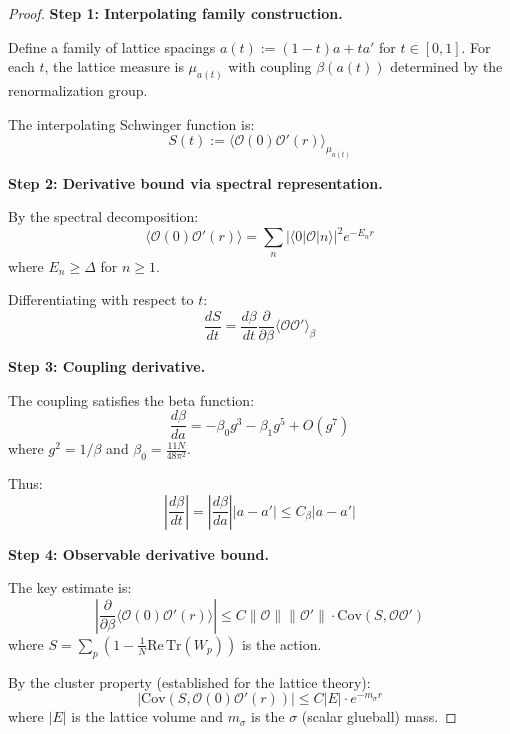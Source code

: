 \begin{proof}
\textbf{Step 1: Interpolating family construction.}

Define a family of lattice spacings $a(t) := (1-t)a + ta'$ for $t \in [0,1]$.
For each $t$, the lattice measure is $\mu_{a(t)}$ with coupling $\beta(a(t))$ 
determined by the renormalization group.

The interpolating Schwinger function is:
\begin{equation}
S(t) := \langle \mathcal{O}(0) \mathcal{O}'(r) \rangle_{\mu_{a(t)}}
\end{equation}

\textbf{Step 2: Derivative bound via spectral representation.}

By the spectral decomposition:
\begin{equation}
\langle \mathcal{O}(0) \mathcal{O}'(r) \rangle = \sum_n |\langle 0 | \mathcal{O} | n \rangle|^2 e^{-E_n r}
\end{equation}
where $E_n \geq \Delta$ for $n \geq 1$.

Differentiating with respect to $t$:
\begin{equation}
\frac{dS}{dt} = \frac{d\beta}{dt} \frac{\partial}{\partial \beta} \langle \mathcal{O} \mathcal{O}' \rangle_\beta
\end{equation}

\textbf{Step 3: Coupling derivative.}

The coupling satisfies the beta function:
\begin{equation}
\frac{d\beta}{da} = -\beta_0 g^3 - \beta_1 g^5 + O(g^7)
\end{equation}
where $g^2 = 1/\beta$ and $\beta_0 = \frac{11N}{48\pi^2}$.

Thus:
\begin{equation}
\left|\frac{d\beta}{dt}\right| = \left|\frac{d\beta}{da}\right| |a - a'| \leq C_\beta |a - a'|
\end{equation}

\textbf{Step 4: Observable derivative bound.}

The key estimate is:
\begin{equation}
\left|\frac{\partial}{\partial \beta} \langle \mathcal{O}(0) \mathcal{O}'(r) \rangle\right|
\leq C \|\mathcal{O}\| \|\mathcal{O}'\| \cdot \text{Cov}(S, \mathcal{O}\mathcal{O}')
\end{equation}
where $S = \sum_p (1 - \frac{1}{N}\text{Re}\,\text{Tr}(W_p))$ is the action.

By the cluster property (established for the lattice theory):
\begin{equation}
|\text{Cov}(S, \mathcal{O}(0)\mathcal{O}'(r))| \leq C |E| \cdot e^{-m_\sigma r}
\end{equation}
where $|E|$ is the lattice volume and $m_\sigma$ is the $\sigma$ (scalar glueball) mass.


\end{proof}
